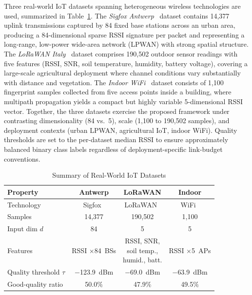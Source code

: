 \documentclass[conference]{IEEEtran}
\begin{document}
Three real-world IoT datasets spanning heterogeneous wireless
technologies are used, summarized in Table~\ref{tab:datasets}.
The \textit{Sigfox Antwerp}~\cite{ref_sigfox} dataset contains 14,377
uplink transmissions captured by 84 fixed base stations across an urban
area, producing a 84-dimensional sparse RSSI signature per packet and
representing a long-range, low-power wide-area network (LPWAN) with
strong spatial structure.
The \textit{LoRaWAN Italy}~\cite{ref_lorawan} dataset comprises 190,502
outdoor sensor readings with five features (RSSI, SNR, soil temperature,
humidity, battery voltage), covering a large-scale agricultural deployment
where channel conditions vary substantially with distance and vegetation.
The \textit{Indoor WiFi}~\cite{ref_indoor} dataset consists of 1,100
fingerprint samples collected from five access points inside a building,
where multipath propagation yields a compact but highly variable 5-dimensional
RSSI vector.
Together, the three datasets exercise the proposed framework under
contrasting dimensionality (84 vs.\ 5), scale (1,100 to 190,502 samples),
and deployment contexts (urban LPWAN, agricultural IoT, indoor WiFi).
Quality thresholds are set to the per-dataset median RSSI to ensure
approximately balanced binary class labels regardless of deployment-specific
link-budget conventions.

\begin{table}[t]
\centering
\caption{Summary of Real-World IoT Datasets}
\label{tab:datasets}
\setlength{\tabcolsep}{4pt}
\renewcommand{\arraystretch}{1.15}
\begin{tabular}{lccc}
\toprule
\textbf{Property}        & \textbf{Antwerp}           & \textbf{LoRaWAN}           & \textbf{Indoor}           \\
\midrule
Technology               & Sigfox~\cite{ref_sigfox}   & LoRaWAN~\cite{ref_lorawan} & WiFi~\cite{ref_indoor}    \\
Samples                  & 14,377                     & 190,502                    & 1,100                     \\
Input dim $d$            & 84                         & 5                          & 5                         \\
Features                 & \shortstack[c]{RSSI\\$\times$84~BSs}
                         & \shortstack[c]{RSSI, SNR,\\soil temp.,\\humid., batt.}
                         & \shortstack[c]{RSSI\\$\times$5~APs}                     \\
Quality threshold $\tau$ & $-$123.9~dBm               & $-$69.0~dBm                & $-$63.9~dBm               \\
Good-quality ratio       & 50.0\%                     & 47.9\%                     & 49.5\%                    \\
\bottomrule
\end{tabular}
\end{table}
\end{document}
